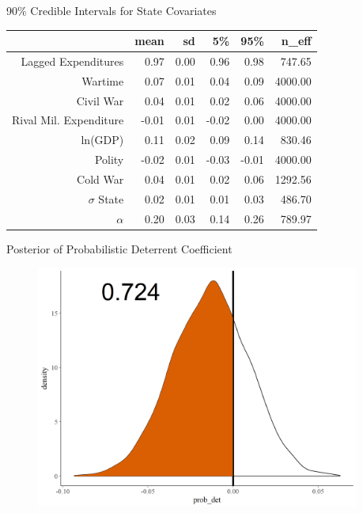 \documentclass{beamer}
\begin{document}
\begin{frame}{90\% Credible Intervals for State Covariates}

\begin{table}[ht]
\centering
\begin{tabular}{rrrrrr}
  \hline
    & mean & sd & 5\% & 95\% & n\_eff  \\ 
  \hline
	Lagged Expenditures & 0.97 & 0.00 & 0.96 & 0.98 & 747.65  \\ 
  Wartime & 0.07 & 0.01 & 0.04 & 0.09 & 4000.00 \\ 
  Civil War & 0.04 & 0.01 & 0.02 & 0.06 & 4000.00  \\ 
  Rival Mil. Expenditure & -0.01 & 0.01 & -0.02 & 0.00 & 4000.00  \\ 
  ln(GDP) & 0.11 & 0.02 & 0.09 & 0.14 & 830.46   \\ 
  Polity & -0.02 & 0.01 & -0.03 & -0.01 & 4000.00 \\ 
  Cold War & 0.04 & 0.01 & 0.02 & 0.06 & 1292.56  \\ 
  $\sigma$ State & 0.02 & 0.01 & 0.01 & 0.03 & 486.70  \\ 
  $\alpha$ & 0.20 & 0.03 & 0.14 & 0.26 & 789.97  \\ 
   \hline
\end{tabular}
\end{table}


\end{frame}


\begin{frame}{Posterior of Probabilistic Deterrent Coefficient}

\begin{figure}
	\centering
		\includegraphics[width=0.95\textwidth]{probdet post_prob.png}
	\label{fig:probdet post_prob}
\end{figure}


\end{frame}
\end{document}
